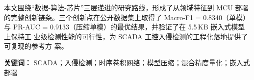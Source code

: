 \par 本文围绕``数据-算法-芯片''三层递进的研究路线，形成了从领域特征到 MCU 部署
的完整创新链条。三个创新点在公开数据集上取得了 Macro-F1 = 0.8340（单模）与
PR-AUC = 0.9133（压缩单模）的最优结果，并验证了在 5.5\,KB 嵌入式模型上保持工
业级检测性能的可行性，为 SCADA 工控入侵检测的工程化落地提供了可复现的参考方
案。

\vspace{1em}

\noindent\textbf{关键词：} SCADA；入侵检测；时序卷积网络；模型压缩；混合精度量化；嵌入式部署

\clearpage
